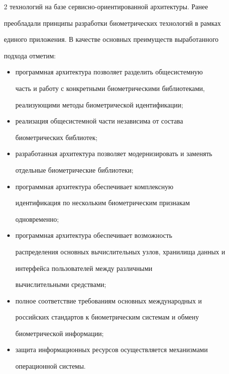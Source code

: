 \begin{multicols}{2}
технологий на базе сервисно-ориентированной архитектуры. Ранее 

преобладали принципы разработки биометрических технологий в рамках 

единого приложения. В качестве основных преимуществ выработанного 

подхода отметим:

  \begin{itemize}

\item программная архитектура позволяет разделить общесистемную 

часть  и работу с конкретными биометрическими библиотеками, 

реализующими методы биометрической идентификации;

\item реализация общесистемной части независима от состава 

биометрических библиотек;

\item разработанная архитектура позволяет модернизировать и заменять 

отдельные биометрические библиотеки;

\item программная архитектура обеспечивает комплексную 

идентификация по нескольким биометрическим признакам 

одновременно;

\item программная архитектура обеспечивает воз\-мож\-ность 

распределения основных вы\-чис\-литель\-ных узлов, хранилища данных и 

интерфейса пользователей между различными %

вычис\-ли\-тель\-ны\-ми  средствами;

\item полное соответствие требованиям основных международных и 

российских стандартов к биометрическим системам и обмену 

биометрической информации;

\item защита информационных ресурсов осуществляется механизмами 

операционной сис\-темы.

\end{itemize}




\end{multicols}
